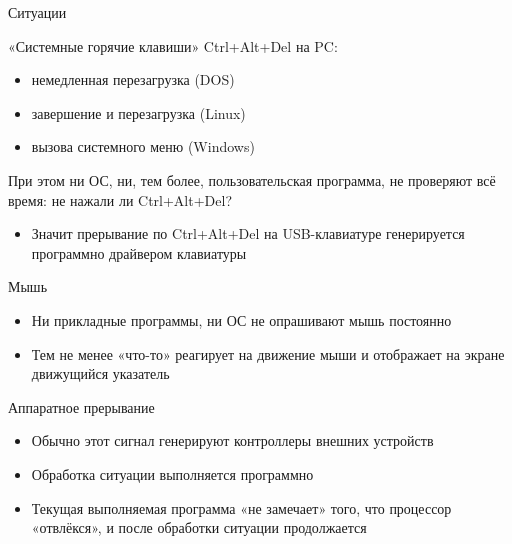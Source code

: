 \documentclass[xetex,aspectratio=43]{beamer}
\begin{document}
\begin{frame}{Ситуации}
	\begin{block}{«Системные горячие клавиши»}
		Ctrl+Alt+Del на PC:

		\begin{itemize}
			\tightlist
			\item
			немедленная перезагрузка (DOS)
			\item
			завершение и перезагрузка (Linux)
			\item
			вызова системного меню (Windows)
		\end{itemize}

		При этом ни ОС, ни, тем более, пользовательская программа, не проверяют всё время: не нажали ли Ctrl+Alt+Del?

		\pause
		\begin{itemize}
			\item
			Значит прерывание по Ctrl+Alt+Del на USB-клавиатуре генерируется
			программно драйвером клавиатуры
		\end{itemize}

	\end{block}

	\pause

	\begin{block}{Мышь}
		\begin{itemize}
			\tightlist
			\item
			Ни прикладные программы, ни ОС не опрашивают мышь постоянно
			\item
			Тем не менее «что-то» реагирует на движение мыши и отображает на
			экране движущийся указатель
		\end{itemize}
	\end{block}
\end{frame}

\begin{frame}{Аппаратное прерывание}

	\begin{itemize}
		\tightlist
		\item
		Обычно этот сигнал генерируют контроллеры внешних устройств
		\item
		Обработка ситуации выполняется программно
		\item
		Текущая выполняемая программа «не замечает» того, что процессор
		«отвлёкся», и после обработки ситуации продолжается
	\end{itemize}
\end{frame}
\end{document}
